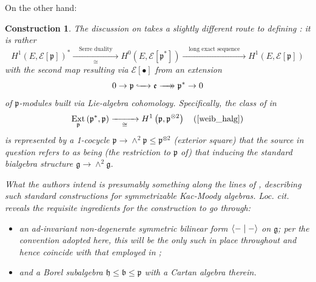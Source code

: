 \documentclass[11pt,leqno]{article}
\theoremstyle{plain}
\theoremstyle{plain}
\theoremstyle{plain}
\newtheorem{construction}[lemma]{Construction}
\numberwithin{equation}{section}
\theoremstyle{nonumberplain}
\newcommand\cE{{\mathcal E}}
\newcommand\fb{{\mathfrak b}}
\newcommand\fe{{\mathfrak e}}
\newcommand\fg{{\mathfrak g}}
\newcommand\fh{{\mathfrak h}}
\newcommand\fp{{\mathfrak p}}
\newcommand\1{{\bf 1}}
\DeclareMathOperator{\Ext}{\mathrm{Ext}}
\newcommand{\xrightarrowdbl}[2][]{%
  \xrightarrow[#1]{#2}\mathrel{\mkern-14mu}\rightarrow
}
\begin{document}
On the other hand:

\begin{construction}\label{con:bunp.poiss.bialg}
  The discussion on \cite[p.67]{FO98} takes a slightly different route to defining : it is rather
  \begin{equation*}
    H^1\left(E,\cE\left[\fp\right]\right)^*
    \xrightarrow[\quad\cong\quad]{\quad\text{Serre duality}\quad}
    H^0\left(E,\cE\left[\fp^*\right]\right)
    \xrightarrow[\quad\quad]{\quad\text{long exact sequence}\quad}
    H^1\left(E,\cE[\fp]\right)
  \end{equation*}
  with the second map resulting via $\cE[\bullet]$ from an extension
  \begin{equation}\label{eq:past.by.p.via.bialg}
    0\to
    \fp
    \lhook\joinrel\xrightarrow{\quad}
    \fe
    \xrightarrowdbl{\quad}
    \fp^*
    \to 0
  \end{equation}
  of $\fp$-modules built via Lie-algebra cohomology. Specifically, the class of  in
    \begin{equation*}
      \Ext_{\fp}\left(\fp^*,\fp\right)
      \xrightarrow[\quad\cong\quad]{\quad}
      H^1\left(\fp,\fp^{\otimes 2}\right)
      \quad
      \left(\text{\cite[Exercise 7.3.5]{weib_halg}}\right)
    \end{equation*}
    is represented by a 1-cocycle $\fp\to \wedge^2 \fp\le \fp^{\otimes 2}$ (exterior square) that the source in question refers to as being (the restriction to $\fp$ of) that inducing the \emph{standard bialgebra structure} $\fg\to \wedge^2 \fg$.

    What the authors intend is presumably something along the lines of \cite[Example 1.3.8]{cp_qg}, describing such standard constructions for symmetrizable Kac-Moody algebras. Loc. cit. reveals the requisite ingredients for the construction to go through:
    \begin{itemize}[wide]
    \item an ad-invariant non-degenerate symmetric bilinear form $\Braket{-\mid -}$ on $\fg$; per the convention adopted here, this will be the only such in place throughout and hence coincide with that employed in ;

    \item and a Borel subalgebra $\fh\le \fb\le \fp$ with a Cartan algebra therein.
    \end{itemize}
\end{construction}
\end{document}
